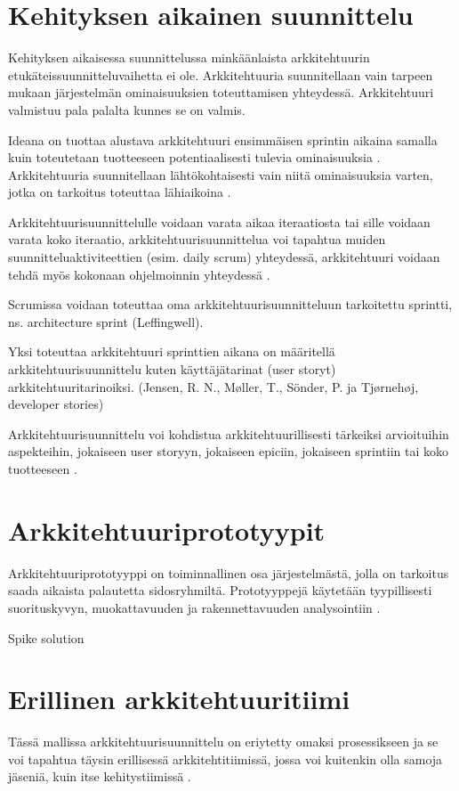 \section{Kehityksen aikainen suunnittelu}
Kehityksen aikaisessa suunnittelussa minkäänlaista arkkitehtuurin etukäteissuunnitteluvaihetta ei ole. Arkkitehtuuria suunnitellaan vain tarpeen mukaan järjestelmän ominaisuuksien toteuttamisen yhteydessä. Arkkitehtuuri valmistuu pala palalta kunnes se on valmis.

Ideana on tuottaa alustava arkkitehtuuri ensimmäisen sprintin aikaina samalla kuin toteutetaan tuotteeseen potentiaalisesti tulevia ominaisuuksia \citep{eloranta2015techniques}. Arkkitehtuuria suunnitellaan lähtökohtaisesti vain niitä ominaisuuksia varten, jotka on tarkoitus toteuttaa lähiaikoina \citep{waterman_how_2015}. 

Arkkitehtuurisuunnittelulle voidaan varata aikaa iteraatiosta tai sille voidaan varata koko iteraatio, arkkitehtuurisuunnittelua voi tapahtua muiden suunnitteluaktiviteettien (esim. daily scrum) yhteydessä, arkkitehtuuri voidaan tehdä myös kokonaan ohjelmoinnin yhteydessä \citep{rost_distilling_2015}. 

Scrumissa voidaan toteuttaa oma arkkitehtuurisuunnitteluun tarkoitettu sprintti, ns. architecture sprint (Leffingwell).

Yksi toteuttaa arkkitehtuuri sprinttien aikana on määritellä arkkitehtuurisuunnittelu kuten käyttäjätarinat (user storyt) arkkitehtuuritarinoiksi. (Jensen, R. N., Møller, T., Sönder, P. ja Tjørnehøj, developer stories)

Arkkitehtuurisuunnittelu voi kohdistua arkkitehtuurillisesti tärkeiksi arvioituihin  aspekteihin, jokaiseen user storyyn, jokaiseen epiciin, jokaiseen sprintiin tai koko tuotteeseen \citep{rost_distilling_2015}.

\section{Arkkitehtuuriprototyypit}
Arkkitehtuuriprototyyppi on toiminnallinen osa järjestelmästä, jolla on tarkoitus saada aikaista palautetta sidosryhmiltä. Prototyyppejä käytetään tyypillisesti suorituskyvyn, muokattavuuden ja rakennettavuuden analysointiin \citep{babar_agile_2013}. 

Spike solution
\section{Erillinen arkkitehtuuritiimi}
Tässä mallissa arkkitehtuurisuunnittelu on eriytetty omaksi prosessikseen ja se voi tapahtua täysin erillisessä arkkitehtitiimissä, jossa voi kuitenkin olla samoja jäseniä, kuin itse kehitystiimissä \citep{eloranta2015techniques}.

